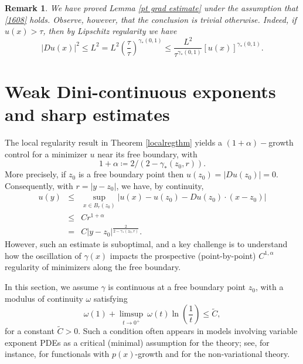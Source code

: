 \documentclass[reqno,11pt]{amsart}
\newtheorem{remark}{Remark}[section]
\newcommand{\1}{\mathds{1}}
\numberwithin{equation}{section}
\begin{document}
\begin{remark}\label{estimate far from FB}
We have proved Lemma \ref{pt grad estimate} under the assumption that \eqref{1608} holds. Observe, however, that the conclusion is trivial otherwise. Indeed, if $u(x) > \tau$, then by Lipschitz regularity we have
$$
    |Du(x)|^2 \leq L^2 = L^2 \left(\frac{\tau}{\tau} \right)^{\gamma_\ast(0,1)} \leq  \frac{L^2}{\tau^{\gamma_\ast(0,1)}} [u(x)]^{\gamma_\ast(0,1)}.
$$
\end{remark}

\section{Weak Dini-continuous exponents and sharp estimates}\label{sct beicodebode}

The local regularity result in Theorem \ref{localregthm} yields a $(1+\alpha)-$growth control for a minimizer $u$ near its free boundary, with 
$$1+\alpha \coloneqq 2/(2-\gamma_\ast(z_0,r)).$$
More precisely, if $z_0$ is a free boundary point then $u(z_0) = |Du (z_0)| = 0$. Consequently, with $r=|y-z_0|$, we have, by continuity,
\begin{eqnarray*}
u(y) & \leq & \sup_{x \in B_{r}(z_0)} \left| u(x)-u(z_0) -Du(z_0)\cdot (x-z_0) \right| \\
& \leq & C r^{1+\alpha}\\
& = & C |y-z_0|^{\frac{2}{2-\gamma_\ast(z_0,r)}}.
\end{eqnarray*}
However, such an estimate is suboptimal, and a key challenge is to understand how the oscillation of $\gamma(x)$ impacts the prospective (point-by-point) $C^{1,\alpha}$ regularity of minimizers along the free boundary. 

In this section, we assume $\gamma$ is continuous at a free boundary point $z_0$, with a modulus of continuity $\omega$ satisfying 
\begin{equation}\label{CMC}
	\omega(1) + \limsup_{t\to 0^+} \ \omega(t) \ln \left( \frac{1}{t} \right ) \le \tilde{C},
\end{equation}
for a constant $\tilde{C}>0$. Such a condition often appears in models involving variable exponent PDEs as a critical (minimal) assumption for the theory; see, for instance, \cite{ABF} for functionals with $p(x)$-growth and \cite{BPRT} for the non-variational theory.
\end{document}
